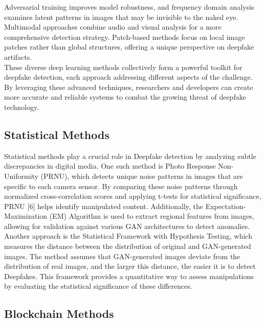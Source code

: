 \documentclass[conference]{IEEEtran}
\begin{document}
            Adversarial training improves model robustness, and frequency domain analysis examines latent patterns in images that may be invisible to the naked eye. Multimodal approaches combine audio and visual analysis for a more comprehensive detection strategy. Patch-based methods focus on local image patches rather than global structures, offering a unique perspective on deepfake artifacts. \\
            
            These diverse deep learning methods collectively form a powerful toolkit for deepfake detection, each approach addressing different aspects of the challenge. By leveraging these advanced techniques, researchers and developers can create more accurate and reliable systems to combat the growing threat of deepfake technology.
            
            \subsection{Statistical Methods}
            
            Statistical methods play a crucial role in Deepfake detection by analyzing subtle discrepancies in digital media. One such method is Photo Response Non-Uniformity (PRNU), which detects unique noise patterns in images that are specific to each camera sensor. By comparing these noise patterns through normalized cross-correlation scores and applying t-tests for statistical significance, PRNU [6] helps identify manipulated content. Additionally, the Expectation-Maximization (EM) Algorithm is used to extract regional features from images, allowing for validation against various GAN architectures to detect anomalies.\\
            
            Another approach is the Statistical Framework with Hypothesis Testing, which measures the distance between the distribution of original and GAN-generated images. The method assumes that GAN-generated images deviate from the distribution of real images, and the larger this distance, the easier it is to detect Deepfakes. This framework provides a quantitative way to assess manipulations by evaluating the statistical significance of these differences.
            
            \subsection{Blockchain Methods}
            
\end{document}
